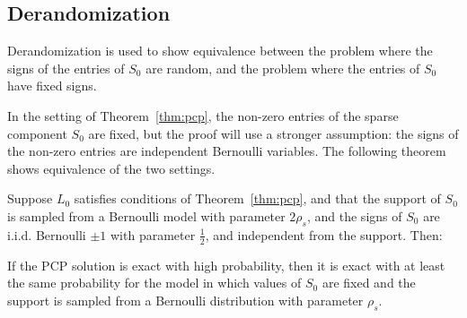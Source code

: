 \subsection{Derandomization}
Derandomization is used to show equivalence between the problem where the signs of the entries of $S_0$ are random, and the problem where the entries of $S_0$ have fixed signs.

In the setting of Theorem~\ref{thm:pcp}, the non-zero entries of the sparse component $S_0$ are fixed, but the proof will use a stronger assumption: the signs of the non-zero entries are independent Bernoulli variables. The following theorem shows equivalence of the two settings.

\begin{theorem}
Suppose $L_0$ satisfies conditions of Theorem~\ref{thm:pcp}, and that the support of $S_0$ is sampled from a Bernoulli model with parameter $2\rho_s$, and the signs of $S_0$ are i.i.d. Bernoulli $\pm 1$ with parameter $\frac{1}{2}$, and independent from the support. Then:

If the PCP solution is exact with high probability, then it is exact with at least the same probability for the model in which values of $S_0$ are fixed and the support is sampled from a Bernoulli distribution with parameter $\rho_s$.
\end{theorem}

